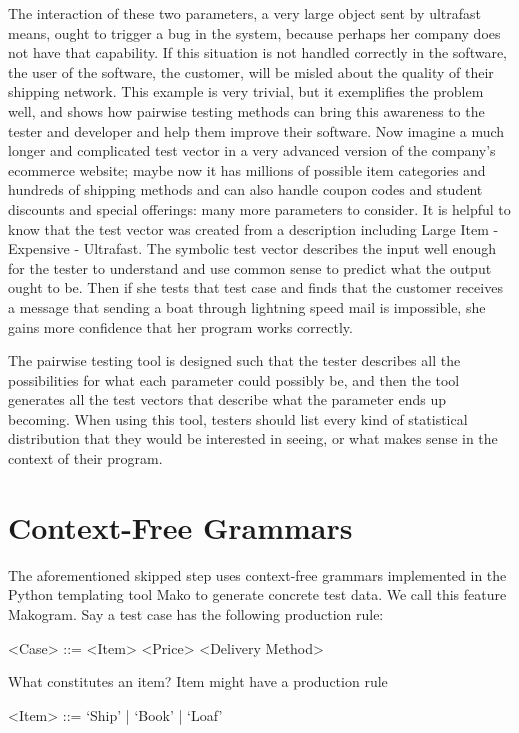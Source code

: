 The interaction of these two parameters, a very large object sent by ultrafast means, ought to trigger a bug in the system, because perhaps her company does not have that capability. If this situation is not handled correctly in the software, the user of the software, the customer, will be misled about the quality of their shipping network. This example is very trivial, but it exemplifies the problem well, and shows how pairwise testing methods can bring this awareness to the tester and developer and help them improve their software. Now imagine a much longer and complicated test vector in a very advanced version of the company’s ecommerce website; maybe now it has millions of possible item categories and hundreds of shipping methods and can also handle coupon codes and student discounts and special offerings: many more parameters to consider. It is helpful to know that the test vector was created from a description including Large Item - Expensive - Ultrafast. The symbolic test vector describes the input well enough for the tester to understand and use common sense to predict what the output ought to be. Then if she tests that test case and finds that the customer receives a message that sending a boat through lightning speed mail is impossible, she gains more confidence that her program works correctly.

The pairwise testing tool is designed such that the tester describes all the possibilities for what each parameter could possibly be, and then the tool generates all the test vectors that describe what the parameter ends up becoming. When using this tool, testers should list every kind of statistical distribution that they would be interested in seeing, or what makes sense in the context of their program.

\section{Context-Free Grammars}
The aforementioned skipped step uses context-free grammars implemented in the Python templating tool Mako to generate concrete test data. We call this feature Makogram. Say a test case has the following production rule:

\begin{grammar}
<Case> ::= <Item> <Price> <Delivery Method>
\end{grammar}

What constitutes an item? Item might have a production rule 
\begin{grammar}
<Item> ::= `Ship' | `Book' | `Loaf'
\end{grammar}


